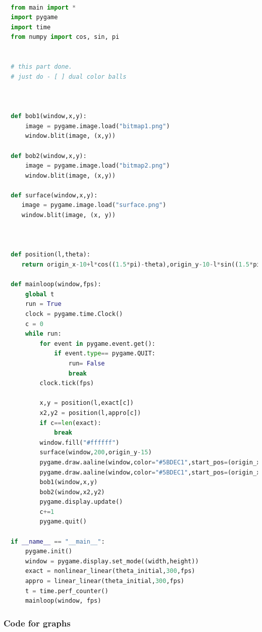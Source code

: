 \documentclass[11pt,a4paper]{article}
\begin{document}
\begin{lstlisting}[language=Python]

  from main import *
  import pygame
  import time
  from numpy import cos, sin, pi


  # this part done.
  # just do - [ ] dual color balls



  def bob1(window,x,y):
      image = pygame.image.load("bitmap1.png")
      window.blit(image, (x,y))

  def bob2(window,x,y):
      image = pygame.image.load("bitmap2.png")
      window.blit(image, (x,y))

  def surface(window,x,y):
     image = pygame.image.load("surface.png")
     window.blit(image, (x, y))



  def position(l,theta):
     return origin_x-10+l*cos((1.5*pi)-theta),origin_y-10-l*sin((1.5*pi)-theta)

  def mainloop(window,fps):
      global t
      run = True
      clock = pygame.time.Clock()
      c = 0
      while run:
          for event in pygame.event.get():
              if event.type== pygame.QUIT:
                  run= False
                  break
          clock.tick(fps)

          x,y = position(l,exact[c])
          x2,y2 = position(l,appro[c])
          if c==len(exact):
              break
          window.fill("#ffffff")
          surface(window,200,origin_y-15)
          pygame.draw.aaline(window,color="#5BDEC1",start_pos=(origin_x,origin_y),end_pos=(x+radius,y+radius))
          pygame.draw.aaline(window,color="#5BDEC1",start_pos=(origin_x,origin_y),end_pos=(x2+10,y2+10))
          bob1(window,x,y)
          bob2(window,x2,y2)
          pygame.display.update()
          c+=1
          pygame.quit()

  if __name__ == "__main__":
      pygame.init()
      window = pygame.display.set_mode((width,height))
      exact = nonlinear_linear(theta_initial,300,fps)
      appro = linear_linear(theta_initial,300,fps)
      t = time.perf_counter()
      mainloop(window, fps)


\end{lstlisting}

\subsubsection{Code for graphs}
\label{sec:org6aba5fa}
\end{document}
